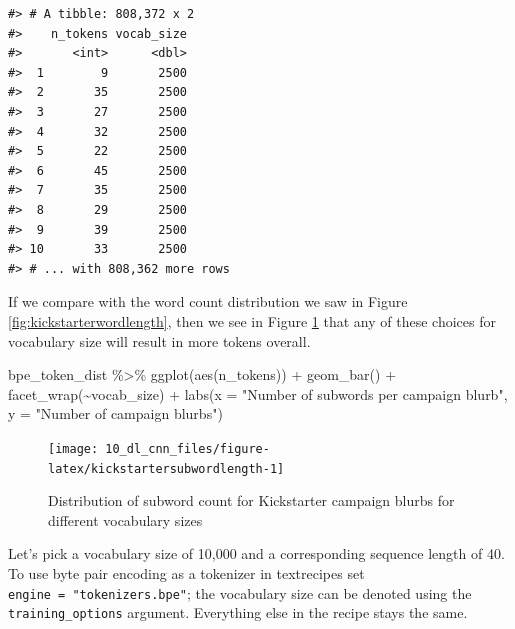 \documentclass[
]{krantz}
\makeatletter
\newenvironment{Shaded}{\begin{snugshade}}{\end{snugshade}}
\newcommand{\AttributeTok}[1]{\textcolor[rgb]{0.77,0.63,0.00}{#1}}
\newcommand{\FunctionTok}[1]{\textcolor[rgb]{0.00,0.00,0.00}{#1}}
\newcommand{\NormalTok}[1]{#1}
\newcommand{\SpecialCharTok}[1]{\textcolor[rgb]{0.00,0.00,0.00}{#1}}
\newcommand{\StringTok}[1]{\textcolor[rgb]{0.31,0.60,0.02}{#1}}
\newenvironment{kframe}{%
\medskip{}
\setlength{\fboxsep}{.8em}
 \def\at@end@of@kframe{}%
 \ifinner\ifhmode%
  \def\at@end@of@kframe{\end{minipage}}%
  \begin{minipage}{\columnwidth}%
 \fi\fi%
 \def\FrameCommand##1{\hskip\@totalleftmargin \hskip-\fboxsep
 \colorbox{shadecolor}{##1}\hskip-\fboxsep
     \hskip-\linewidth \hskip-\@totalleftmargin \hskip\columnwidth}%
 \MakeFramed {\advance\hsize-\width
   \@totalleftmargin\z@ \linewidth\hsize
   \@setminipage}}%
 {\par\unskip\endMakeFramed%
 \at@end@of@kframe}
\renewenvironment{Shaded}{\begin{kframe}}{\end{kframe}}
\makeatother
\begin{document}
\begin{verbatim}
#> # A tibble: 808,372 x 2
#>    n_tokens vocab_size
#>       <int>      <dbl>
#>  1        9       2500
#>  2       35       2500
#>  3       27       2500
#>  4       32       2500
#>  5       22       2500
#>  6       45       2500
#>  7       35       2500
#>  8       29       2500
#>  9       39       2500
#> 10       33       2500
#> # ... with 808,362 more rows
\end{verbatim}

If we compare with the word count distribution we saw in Figure \ref{fig:kickstarterwordlength}, then we see in Figure \ref{fig:kickstartersubwordlength} that any of these choices for vocabulary size will result in more tokens overall.

\begin{Shaded}
\begin{Highlighting}[]
\NormalTok{bpe\_token\_dist }\SpecialCharTok{\%\textgreater{}\%}
  \FunctionTok{ggplot}\NormalTok{(}\FunctionTok{aes}\NormalTok{(n\_tokens)) }\SpecialCharTok{+}
  \FunctionTok{geom\_bar}\NormalTok{() }\SpecialCharTok{+}
  \FunctionTok{facet\_wrap}\NormalTok{(}\SpecialCharTok{\textasciitilde{}}\NormalTok{vocab\_size) }\SpecialCharTok{+}
  \FunctionTok{labs}\NormalTok{(}\AttributeTok{x =} \StringTok{"Number of subwords per campaign blurb"}\NormalTok{,}
       \AttributeTok{y =} \StringTok{"Number of campaign blurbs"}\NormalTok{)}
\end{Highlighting}
\end{Shaded}

\begin{figure}

{\centering \texttt{[image: 10\_dl\_cnn\_files/figure-latex/kickstartersubwordlength-1]} 

}

\caption{Distribution of subword count for Kickstarter campaign blurbs for different vocabulary sizes}\label{fig:kickstartersubwordlength}
\end{figure}

Let's pick a vocabulary size of 10,000 and a corresponding sequence length of 40. To use byte pair encoding as a tokenizer in textrecipes set \texttt{engine\ =\ "tokenizers.bpe"}; the vocabulary size can be denoted using the \texttt{training\_options} argument. Everything else in the recipe stays the same.
\end{document}
